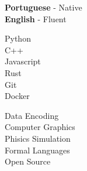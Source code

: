 \documentclass[11pt]{developercv} %
\begin{document}

\begin{minipage}[t]{0.3\textwidth}
	\vspace{-\baselineskip} %
 
	\textbf{Portuguese} - Native \\
	\textbf{English} - Fluent
\end{minipage}
\hfill
\begin{minipage}[t]{0.3\textwidth}
	\vspace{-\baselineskip} %
 
    Python\\
    C++\\
    Javascript\\
	Rust\\
    Git\\
    Docker\\
    
    
\end{minipage}
\hfill
\begin{minipage}[t]{0.3\textwidth}
	\vspace{-\baselineskip} %
 
    Data Encoding\\
    Computer Graphics\\
    Phisics Simulation\\
	Formal Languages\\
    Open Source
\end{minipage}

\end{document}
